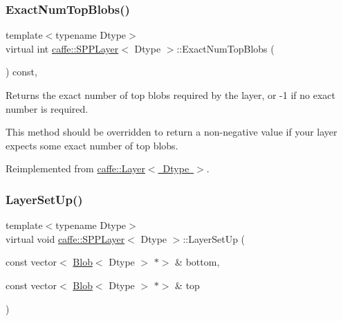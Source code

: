 \subsubsection{\texorpdfstring{Exact\+Num\+Top\+Blobs()}{ExactNumTopBlobs()}\hspace{0.1cm}{\footnotesize\ttfamily [2/2]}}
{\footnotesize\ttfamily template$<$typename Dtype$>$ \\
virtual int \mbox{\hyperlink{classcaffe_1_1_s_p_p_layer}{caffe\+::\+S\+P\+P\+Layer}}$<$ Dtype $>$\+::Exact\+Num\+Top\+Blobs (\begin{DoxyParamCaption}{ }\end{DoxyParamCaption}) const\hspace{0.3cm}{\ttfamily [inline]}, {\ttfamily [virtual]}}



Returns the exact number of top blobs required by the layer, or -\/1 if no exact number is required. 

This method should be overridden to return a non-\/negative value if your layer expects some exact number of top blobs. 

Reimplemented from \mbox{\hyperlink{classcaffe_1_1_layer_a64e2ca72c719e4b2f1f9216ccfb0d37f}{caffe\+::\+Layer$<$ Dtype $>$}}.

\mbox{\label{classcaffe_1_1_s_p_p_layer_aceca092b11940864ae7033a2c0cfa8cc}} 
\subsubsection{\texorpdfstring{Layer\+Set\+Up()}{LayerSetUp()}\hspace{0.1cm}{\footnotesize\ttfamily [1/2]}}
{\footnotesize\ttfamily template$<$typename Dtype$>$ \\
virtual void \mbox{\hyperlink{classcaffe_1_1_s_p_p_layer}{caffe\+::\+S\+P\+P\+Layer}}$<$ Dtype $>$\+::Layer\+Set\+Up (\begin{DoxyParamCaption}\item[{const vector$<$ \mbox{\hyperlink{classcaffe_1_1_blob}{Blob}}$<$ Dtype $>$ $\ast$$>$ \&}]{bottom,  }\item[{const vector$<$ \mbox{\hyperlink{classcaffe_1_1_blob}{Blob}}$<$ Dtype $>$ $\ast$$>$ \&}]{top }\end{DoxyParamCaption})\hspace{0.3cm}{\ttfamily [virtual]}}



